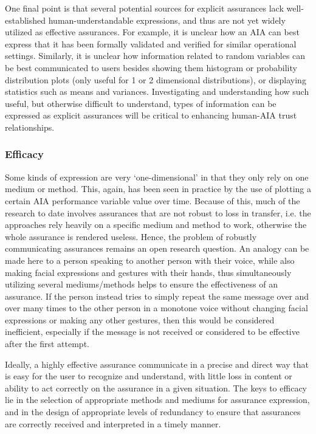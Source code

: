 One final point is that several potential sources for explicit assurances lack well-established human-understandable expressions, and thus are not yet widely utilized as effective assurances. For example, it is unclear how an AIA can best express that it has been formally validated and verified for similar operational settings. 
Similarly, it is unclear how information related to random variables can be best communicated to users besides showing them histogram or probability distribution plots (only useful for 1 or 2 dimensional distributions), or displaying statistics such as means and variances. 
Investigating and understanding how such useful, but otherwise difficult to understand, types of information can be expressed as explicit assurances will be critical to enhancing human-AIA trust relationships. 

\subsubsection{Efficacy}
Some kinds of expression are very `one-dimensional' in that they only rely on one medium or method. This, again, has been seen in practice by the use of plotting a certain AIA performance variable value over time. Because of this, much of the research to date involves assurances that are not robust to loss in transfer, i.e. the approaches rely heavily on a specific medium and method to work, otherwise the whole assurance is rendered useless. Hence, the problem of robustly communicating assurances remains an open research question. An analogy can be made here to a person speaking to another person with their voice, while also making facial expressions and gestures with their hands, thus simultaneously utilizing several mediums/methods helps to ensure the effectiveness of an assurance. If the person instead tries to simply repeat the same message over and over many times to the other person in a monotone voice without changing facial expressions or making any other gestures, then this would be considered inefficient, especially if the message is not received or considered to be effective after the first attempt. %
    
Ideally, a highly effective assurance communicate in a precise and direct way that is easy for the user to recognize and understand, with little loss in content or ability to act correctly on the assurance in a given situation. 
The keys to efficacy lie in the selection of appropriate methods and mediums for assurance expression, and in the design of appropriate levels of redundancy to ensure that assurances are correctly received and interpreted in a timely manner.
